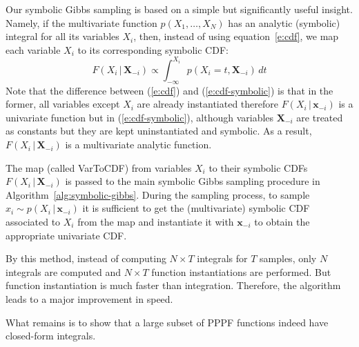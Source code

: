 \documentclass{article}
\newcommand{\bvec}[1]{\textbf{#1}}
\newcommand{\pr}{p}
\begin{document}
Our symbolic Gibbs sampling is based on a simple but significantly useful insight.
Namely, if the multivariate function $\pr(X_1, \ldots, X_N)$
has an analytic (symbolic) integral for all its variables $X_i$,
then, instead of using equation~\ref{e:cdf}, we map each variable $X_i$ to its corresponding symbolic CDF: 
{\footnotesize
\begin{equation}
\label{e:cdf-symbolic}
F(X_i  \,|\, \bvec{X}_{-i}) 
\propto
\int_{-\infty}^{X_i} \!\!\!\!\! \pr(X_i = t , \bvec{X}_{-i}) \, d  t
\end{equation} 
}
Note that the difference between (\ref{e:cdf}) and (\ref{e:cdf-symbolic}) is that in the former, 
all variables except $X_i$ are already instantiated therefore 
$F(X_i  \,|\, \bvec{x}_{-i})$ is a univariate function but in  (\ref{e:cdf-symbolic}), 
although variables $\bvec{X}_{-i}$ are treated as constants but they are kept uninstantiated and symbolic.
As a result, $F(X_i \,|\, \bvec{X}_{-i})$ is a multivariate analytic function. 

The map (called {\sc VarToCDF}) from variables $X_i$ to their symbolic CDFs
$F(X_i \,|\, \bvec{X}_{-i})$ is passed to the main symbolic Gibbs sampling procedure in Algorithm~\ref{alg:symbolic-gibbs}.
During the sampling process, 
to sample $x_i \sim \pr(X_i \,|\, \bvec{x}_{-i})$
it is sufficient to get the (multivariate) symbolic CDF associated to $X_i$ from the map
and instantiate it with $\bvec{x}_{-i}$ to obtain the appropriate univariate CDF.

By this method, instead of computing $N \times T$ integrals for $T$ samples, only $N$ integrals are computed and 
$N \times T$ function instantiations are performed. But function instantiation is much faster than integration.
Therefore, the algorithm leads to a major improvement in speed.

What remains is to show that a large subset of PPPF functions indeed have closed-form integrals. 

\end{document}
